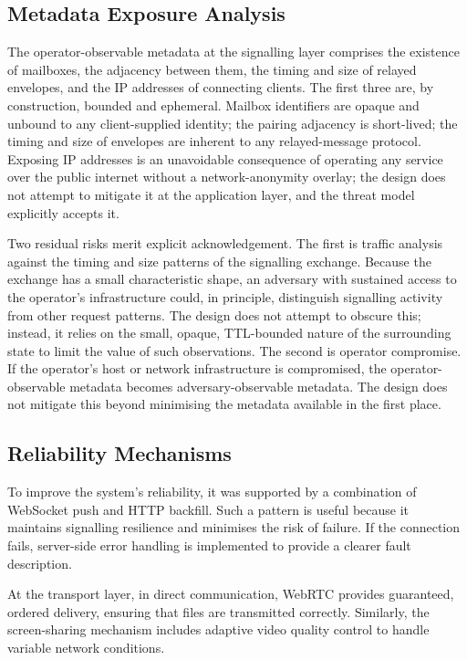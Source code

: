 \documentclass[12pt,a4paper,oneside]{report}
\begin{document}
\subsection{Metadata Exposure Analysis}
\label{sec:metadata-exposure}

The operator-observable metadata at the signalling layer comprises the existence of mailboxes, the adjacency between them, the timing and size of relayed envelopes, and the IP addresses of connecting clients. The first three are, by construction, bounded and ephemeral. Mailbox identifiers are opaque and unbound to any client-supplied identity; the pairing adjacency is short-lived; the timing and size of envelopes are inherent to any relayed-message protocol. Exposing IP addresses is an unavoidable consequence of operating any service over the public internet without a network-anonymity overlay; the design does not attempt to mitigate it at the application layer, and the threat model explicitly accepts it.

Two residual risks merit explicit acknowledgement. The first is traffic analysis against the timing and size patterns of the signalling exchange. Because the exchange has a small characteristic shape, an adversary with sustained access to the operator's infrastructure could, in principle, distinguish signalling activity from other request patterns. The design does not attempt to obscure this; instead, it relies on the small, opaque, TTL-bounded nature of the surrounding state to limit the value of such observations. The second is operator compromise. If the operator's host or network infrastructure is compromised, the operator-observable metadata becomes adversary-observable metadata. The design does not mitigate this beyond minimising the metadata available in the first place.


\subsection{Reliability Mechanisms}
\label{sec:reliability}

To improve the system's reliability, it was supported by a combination of WebSocket push and HTTP backfill. Such a pattern is useful because it maintains signalling resilience and minimises the risk of failure. If the connection fails, server-side error handling is implemented to provide a clearer fault description.

At the transport layer, in direct communication, WebRTC provides guaranteed, ordered delivery, ensuring that files are transmitted correctly. Similarly, the screen-sharing mechanism includes adaptive video quality control to handle variable network conditions.
\end{document}
